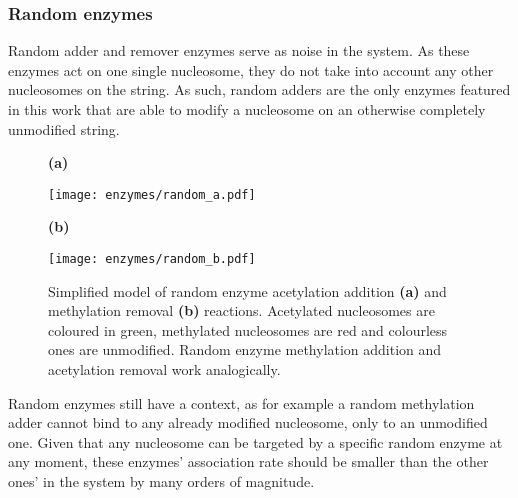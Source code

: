             \subsubsection*{Random enzymes}
                Random adder and remover enzymes serve as noise in the system. As these enzymes act on one single nucleosome, they do not take into account any other nucleosomes on the string. As such, random adders are the only enzymes featured in this work that are able to modify a nucleosome on an otherwise completely unmodified string.
                \begin{figure}[htpb!]
                    \centering
                    \begin{minipage}[t][5cm]{\textwidth}
                        \begin{minipage}{0.15\textwidth}
                            \caption*{\small \textbf{(a)}}
                        \end{minipage}
                        \begin{minipage}{0.8\textwidth}
                            \texttt{[image: enzymes/random\_a.pdf]}
                        \end{minipage}
                        \vfill
                        \begin{minipage}{0.15\textwidth}
                            \caption*{\small \textbf{(b)}}
                        \end{minipage}
                        \begin{minipage}{0.8\textwidth}
                            \texttt{[image: enzymes/random\_b.pdf]}
                        \end{minipage}
                    \end{minipage}
                    \caption{Simplified model of random enzyme acetylation addition \textbf{(a)} and methylation removal \textbf{(b)} reactions. Acetylated nucleosomes are coloured in green, methylated nucleosomes are red and colourless ones are unmodified. Random enzyme methylation addition and acetylation removal work analogically.}
                    \label{img:randomEnzymes}
                \end{figure}

                Random enzymes still have a context, as for example a random methylation adder cannot bind to any already modified nucleosome, only to an unmodified one. Given that any nucleosome can be targeted by a specific random enzyme at any moment, these enzymes' association rate should be smaller than the other ones' in the system by many orders of magnitude.

